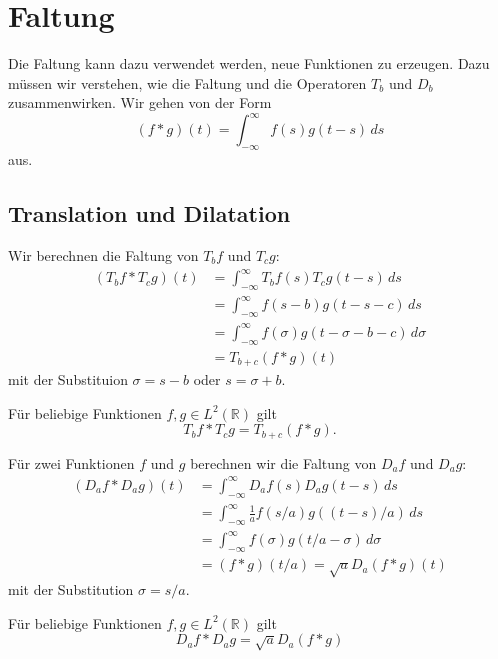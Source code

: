 %
%
%
\section{Faltung
\label{section:faltung}}
Die Faltung kann dazu verwendet werden, neue Funktionen zu erzeugen.
Dazu müssen wir verstehen, wie die Faltung und die Operatoren $T_b$ und
$D_b$ zusammenwirken.
Wir gehen von der Form
\[
(f*g)(t)
=
\int_{-\infty}^\infty f(s)g(t-s)\,ds
\]
aus.

\subsection{Translation und Dilatation
\label{subsection:translation-und-dialatation}}
Wir berechnen die Faltung von $T_bf$ und $T_cg$:
\begin{align*}
(T_bf * T_cg)(t)
&=
\int_{-\infty}^\infty T_bf(s) T_cg(t-s)\,ds
\\
&=
\int_{-\infty}^\infty f(s-b) g(t-s-c)\,ds
\\
&=
\int_{-\infty}^\infty f(\sigma) g(t-\sigma-b-c)\,d\sigma
\\
&=
T_{b+c}(f*g)(t)
\end{align*}
mit der Substituion $\sigma=s-b$ oder $s=\sigma+b$.

\begin{satz}
Für beliebige Funktionen $f,g\in L^2(\mathbb R)$ gilt
\begin{equation}
T_bf*T_cg
=
T_{b+c}(f*g).
\label{eq:Tconv}
\end{equation}
\end{satz}

Für zwei Funktionen $f$ und $g$ berechnen wir die Faltung von
$D_af$ und $D_ag$:
\begin{align*}
(D_af * D_ag)(t)
&=
\int_{-\infty}^\infty D_af(s) D_ag(t-s)\,ds
\\
&=
\int_{-\infty}^\infty \frac{1}{a}f(s/a) g((t-s)/a)\,ds
\\
&=
\int_{-\infty}^\infty f(\sigma) g(t/a- \sigma)\,d\sigma
\\
&=
(f*g)(t/a) = \sqrt{a} D_a(f*g)(t)
\end{align*}
mit der Substitution $\sigma=s/a$.

\begin{satz}
Für beliebige Funktionen $f,g\in L^2(\mathbb R)$ gilt
\begin{equation}
D_af * D_ag = \sqrt{a}D_a(f*g)
\label{eq:Dconv}
\end{equation}
\end{satz}

